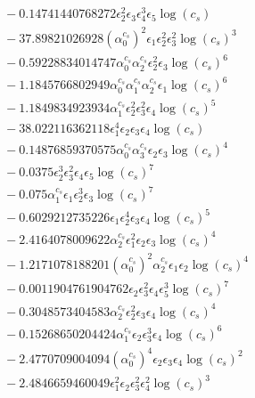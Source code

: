 \documentclass[10pt]{article}
\begin{document}
\begin{align*}
&{}  - 0.14741440768272 \epsilon_{2}^{2} \epsilon_{3} \epsilon_{4}^{3} \epsilon_{5} \log{\left(c_{s} \right)} \\
&{}  - 37.89821026928 \left(\alpha_{0}^{c_s}\right)^{2} \epsilon_{1} \epsilon_{2}^{2} \epsilon_{3}^{2} \log{\left(c_{s} \right)}^{3} \\
&{}  - 0.59228834014747 \alpha_{0}^{c_s} \alpha_{2}^{c_s} \epsilon_{2}^{2} \epsilon_{3} \log{\left(c_{s} \right)}^{6} \\
&{}  - 1.1845766802949 \alpha_{0}^{c_s} \alpha_{1}^{c_s} \alpha_{2}^{c_s} \epsilon_{1} \log{\left(c_{s} \right)}^{6} \\
&{}  - 1.1849834923934 \alpha_{1}^{c_s} \epsilon_{2}^{2} \epsilon_{3}^{2} \epsilon_{4} \log{\left(c_{s} \right)}^{5} \\
&{}  - 38.022116362118 \epsilon_{1}^{4} \epsilon_{2} \epsilon_{3} \epsilon_{4} \log{\left(c_{s} \right)} \\
&{}  - 0.14876859370575 \alpha_{0}^{c_s} \alpha_{3}^{c_s} \epsilon_{2} \epsilon_{3} \log{\left(c_{s} \right)}^{4} \\
&{}  - 0.0375 \epsilon_{2}^{3} \epsilon_{3}^{2} \epsilon_{4} \epsilon_{5} \log{\left(c_{s} \right)}^{7} \\
&{}  - 0.075 \alpha_{1}^{c_s} \epsilon_{1} \epsilon_{2}^{3} \epsilon_{3} \log{\left(c_{s} \right)}^{7} \\
&{}  - 0.6029212735226 \epsilon_{1} \epsilon_{2}^{4} \epsilon_{3} \epsilon_{4} \log{\left(c_{s} \right)}^{5} \\
&{}  - 2.4164078009622 \alpha_{2}^{c_s} \epsilon_{1}^{2} \epsilon_{2} \epsilon_{3} \log{\left(c_{s} \right)}^{4} \\
&{}  - 1.2171078188201 \left(\alpha_{0}^{c_s}\right)^{2} \alpha_{2}^{c_s} \epsilon_{1} \epsilon_{2} \log{\left(c_{s} \right)}^{4} \\
&{}  - 0.0011904761904762 \epsilon_{2} \epsilon_{3}^{2} \epsilon_{4} \epsilon_{5}^{3} \log{\left(c_{s} \right)}^{7} \\
&{}  - 0.3048573404583 \alpha_{2}^{c_s} \epsilon_{2}^{2} \epsilon_{3} \epsilon_{4} \log{\left(c_{s} \right)}^{4} \\
&{}  - 0.15268650204424 \alpha_{1}^{c_s} \epsilon_{2} \epsilon_{3}^{3} \epsilon_{4} \log{\left(c_{s} \right)}^{6} \\
&{}  - 2.4770709004094 \left(\alpha_{0}^{c_s}\right)^{4} \epsilon_{2} \epsilon_{3} \epsilon_{4} \log{\left(c_{s} \right)}^{2} \\
&{}  - 2.4846659460049 \epsilon_{1}^{2} \epsilon_{2} \epsilon_{3}^{2} \epsilon_{4}^{2} \log{\left(c_{s} \right)}^{3} \\

\end{align*}
\end{document}
